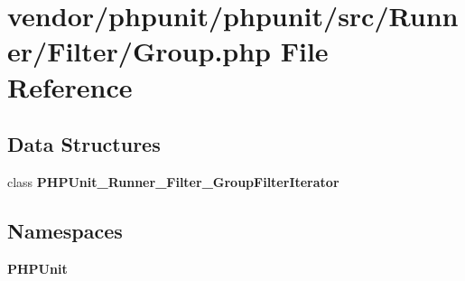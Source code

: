 \section{vendor/phpunit/phpunit/src/\+Runner/\+Filter/\+Group.php File Reference}
\label{_group_8php}
\subsection*{Data Structures}
\begin{DoxyCompactItemize}
\item 
class {\bf P\+H\+P\+Unit\+\_\+\+Runner\+\_\+\+Filter\+\_\+\+Group\+Filter\+Iterator}
\end{DoxyCompactItemize}
\subsection*{Namespaces}
\begin{DoxyCompactItemize}
\item 
 {\bf P\+H\+P\+Unit}
\end{DoxyCompactItemize}
